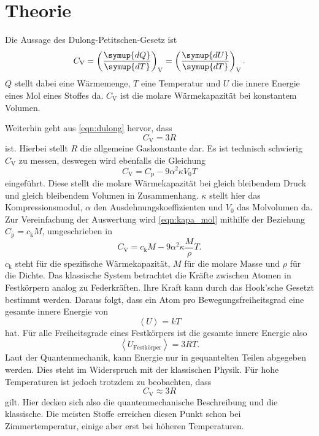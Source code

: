 \section{Theorie}
\label{sec:Theorie}

Die Aussage des Dulong-Petitschen-Gesetz ist
\begin{equation}
    C_\text{V} = \left ( \frac{\symup{dQ}}{\symup{dT}} \right )_\text{V} = \left ( \frac{\symup{dU}}{\symup{dT}} \right )_\text{V}  .
    \label{eqn:dulong}
\end{equation}
$Q$ stellt dabei eine Wärmemenge, $T$ eine Temperatur und $U$ die innere Energie eines Mol eines Stoffes da.
$C_\text{V}$ ist die molare Wärmekapazität bei konstantem Volumen.

Weiterhin geht aus \eqref{eqn:dulong} hervor, dass
\begin{equation}
    C_\text{V} = 3R
    \label{eqn:dulong_klassisch}
\end{equation}
ist. Hierbei stellt $R$ die allgemeine Gaskonstante dar.
Es ist technisch schwierig $C_\text{V}$ zu messen, deswegen wird ebenfalls die Gleichung
\begin{equation}
    C_\text{V} = C_\text{p} - 9 \alpha^2 \kappa V_0 T
    \label{eqn:kapa_mol}
\end{equation}
eingeführt.
Diese stellt die molare Wärmekapazität bei gleich bleibendem Druck und gleich bleibendem Volumen in Zusammenhang.
$\kappa$ stellt hier das Kompressionsmodul, $\alpha$ den Ausdehnungskoeffizienten und $V_0$ das Molvolumen da.
Zur Vereinfachung der Auswertung wird \eqref{eqn:kapa_mol} mithilfe der Beziehung $C_\text{p} = c_\text{k} M$, umgeschrieben in
\begin{equation}
    C_\text{V} = c_\text{k} M - 9\alpha^2 \kappa \frac{M}{\rho}T .
    \label{eqn:waerme_vol}
\end{equation}
$c_\text{k}$ steht für die spezifische Wärmekapazität, $M$ für die molare Masse und $\rho$ für die Dichte.
Das klassische System betrachtet die Kräfte zwischen Atomen in Festkörpern analog zu Federkräften.
Ihre Kraft kann durch das Hook'sche Gesetzt bestimmt werden.
Daraus folgt, dass ein Atom pro Bewegungsfreiheitsgrad eine gesamte innere Energie von
\begin{equation*}
    \left < U \right > = kT
\end{equation*}
hat.
Für alle Freiheitsgrade eines Festkörpers ist die gesamte innere Energie also
\begin{equation*}
    \left < U_\text{Festkörper} \right > = 3RT.
\end{equation*}
Laut der Quantenmechanik, kann Energie nur in gequantelten Teilen abgegeben werden.
Dies steht im Widerspruch mit der klassischen Physik.
Für hohe Temperaturen ist jedoch trotzdem zu beobachten, dass 
\begin{equation*}
    C_\text{V} \approx 3 R
\end{equation*}
gilt.
Hier decken sich also die quantenmechanische Beschreibung und die klassische.
Die meisten Stoffe erreichen diesen Punkt schon bei Zimmertemperatur, einige aber erst bei höheren Temperaturen.

